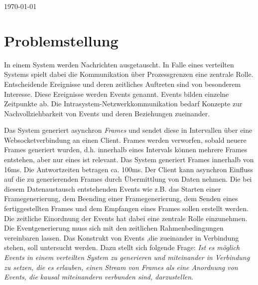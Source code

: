 \documentclass[a4paper]{article}
\begin{document}
\begin{titlepage}
	
	\vfill\vfill\vfill %
	
	{\large \today} %
	
	
	\vfill\vfill
	
	
	\vfill %
	
\end{titlepage}

\tableofcontents
\newpage
{}

\section{Problemstellung}
	In einem System werden Nachrichten ausgetauscht. In Falle eines verteilten Systems spielt dabei die Kommunikation über Prozessgrenzen eine zentrale Rolle.
	Entscheidende Ereignisse und deren zeitliches Auftreten sind von besonderem Interesse. Diese Ereignisse werden Events genannt. Events bilden einzelne Zeitpunkte ab. Die Intrasystem-Netzwerkkommunikation bedarf Konzepte zur Nachvollziehbarkeit von Events und deren Beziehungen zueinander. 
	
	Das System generiert asynchron \emph{Frames} und sendet diese in Intervallen über eine Websocketverbindung an einen Client. Frames werden verworfen, sobald neuere Frames generiert wurden, d.h. innerhalb eines Intervals können mehrere Frames entstehen, aber nur eines ist relevant. Das System generiert Frames innerhalb von 16ms. Die Antwortzeiten betragen ca. 100ms. Der Client kann asynchron Einfluss auf die zu generierenden Frames durch Übermittlung von Daten nehmen. Die bei diesem Datenaustausch entstehenden Events wie z.B. das Starten einer Framegenerierung, dem Beending einer Framegenerierung, dem Senden eines fertiggestellten Frames und dem Empfangen eines Frames sollen erstellt werden. Die zeitliche Einordnung der Events hat dabei eine zentrale Rolle einzunehmen. Die Eventgenerierung muss sich mit den zeitlichen Rahmenbedingungen vereinbaren lassen. Das Konstrukt von Events ,die zueinander in Verbindung stehen, soll untersucht werden. Dazu stellt sich folgende Frage: \emph{Ist es möglich Events in einem verteilten System zu generieren und miteinander in Verbindung zu setzen, die es erlauben, einen Stream von Frames als eine Anordnung von Events, die kausal miteinandern verbunden sind, darzustellen}.
\end{document}
